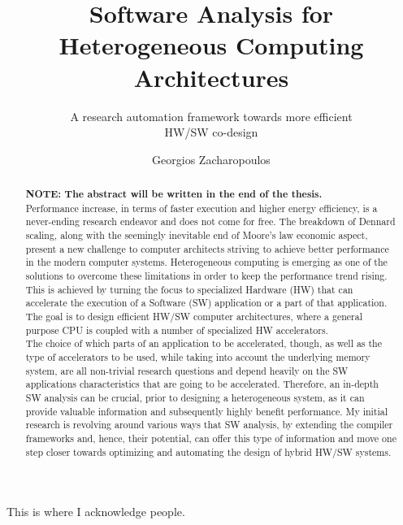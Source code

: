 \documentclass[]{usiinfthesis}
\title{Software Analysis for\\ Heterogeneous Computing Architectures} %
\subtitle{A research automation framework 
towards more efficient\\ HW/SW co-design} %
\author{Georgios Zacharopoulos} %
\begin{document}
\maketitle %

\frontmatter %

\begin{abstract}
\textbf{NOTE: The abstract will be written in the end of the thesis.}\\
Performance increase, in terms of faster execution and higher energy efficiency, 
is a never-ending research endeavor  %
and does not come for free.
The breakdown of Dennard scaling, along with the seemingly inevitable end of 
Moore's law economic aspect, present a new challenge to computer architects striving to achieve
better performance in the modern computer systems. Heterogeneous computing is 
emerging as one of the solutions to overcome these limitations in order to keep the performance 
trend rising. This is achieved by turning the focus to specialized Hardware (HW) that 
can accelerate the execution of a Software (SW) application or a part of that application.
The goal is to design efficient HW/SW computer architectures, where a general purpose CPU
is coupled with a number of specialized HW accelerators.\\
The choice of which parts of an application to be accelerated, though, as well as the type 
of accelerators to be used, while taking into account the underlying memory system, are all
non-trivial research questions and depend heavily on the SW applications characteristics that
are going to be accelerated. Therefore, an in-depth SW analysis can be crucial, prior to 
designing a heterogeneous system, as it can provide valuable information and subsequently 
highly benefit performance. My initial research is revolving around various ways that SW
analysis, by extending the compiler frameworks and, hence, their potential, can offer this 
type of information and move one step closer towards optimizing and automating the design of hybrid HW/SW systems.
\end{abstract}



\begin{acknowledgements}
This is where I acknowledge people.

\end{acknowledgements}
\end{document}
